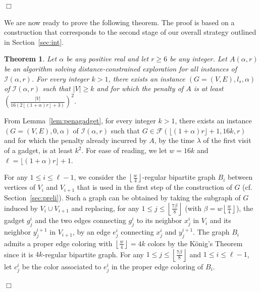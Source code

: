\documentclass[11pt]{article}
\newtheorem{theorem}{Theorem}[section]
\newcommand{\qed}{\hfill $\Box$ \bigbreak}
\newenvironment{proof}{\noindent {\bf Proof.}}{\qed}
\begin{document}
{\begin{proof}
\end{proof}

We are now ready to prove the following theorem. The proof is based on a construction that corresponds to the second stage of our overall strategy outlined in Section~\ref{sec:int}.

\begin{theorem}
\label{theo:theo1}
Let $\alpha$ be any positive real and let $r\geq 6$ be any integer. Let $A(\alpha,r)$ be an algorithm solving distance-constrained exploration for all instances of $\mathcal{I}(\alpha,r)$. For every integer $k>1$, there exists an instance $(G=(V,E),l_s,\alpha)$ of $\mathcal{I}(\alpha,r)$ such that $|V|\geq k$ and for which the penalty of $A$ is at least $\left(\frac{|V|}{16\left(2\left\lfloor(1+\alpha)r\right\rfloor+3\right)}\right)^2$.
\end{theorem}

\begin{proof}
From Lemma~\ref{lem:penagadget}, for every integer $k>1$, there exists an instance $(G=(V,E),0,\alpha)$ of $\mathcal{I}(\alpha,r)$ such that $G\in\mathcal{F}(\lfloor(1+\alpha)r\rfloor+1,16k,r)$ and for which the penalty already incurred by $A$, by the time $\lambda$ of the first visit of a gadget, is at least $k^2$. For ease of reading, we let $w=16k$ and $\ell=\lfloor(1+\alpha)r\rfloor+1$.

For any $1\leq i\leq \ell-1$, we consider the $\left\lfloor \frac{w}{4}\right\rfloor$-regular bipartite graph $B_i$ between vertices of $V_i$ and $V_{i+1}$ that is used in the first step of the construction of $G$ (cf. Section~\ref{sec:preli}). Such a graph can be obtained by taking the subgraph of $G$ induced by $V_i \cup V_{i+1}$ and replacing, for any $1\leq j\leq \left\lfloor\frac{7\beta}{8}\right\rfloor$ (with $\beta=w\left\lfloor\frac{w}{4}\right\rfloor$), the gadget $g^i_j$ and the two edges connecting $g^i_j$ to its neighbor $x_j^i$ in $V_i$ and its neighbor $y_j^{i+1}$ in $V_{i+1}$, by an edge $e_j^i$ connecting $x^i_j$ and $y^{i+1}_j$. The graph $B_i$ admits a proper edge 
coloring with $\left\lfloor \frac{w}{4}\right\rfloor=4k$ colors by the König's Theorem \cite{konig1916} since it is $4k$-regular bipartite graph. For any $1\leq j\leq \left\lfloor\frac{7\beta}{8}\right\rfloor$ and $1\leq i \leq \ell-1$, let $c_j^i$ be the color associated to $e_j^i$ in the proper edge coloring of $B_i$.


\end{proof}}
\end{document}
